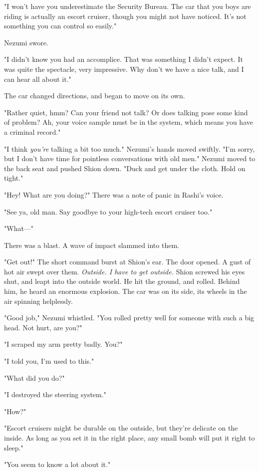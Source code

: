 "I won't have you underestimate the Security Bureau. The car that you
boys are riding is actually an escort cruiser, though you might not have
noticed. It's not something you can control so easily."

Nezumi swore.

"I didn't know you had an accomplice. That was something I didn't
expect. It was quite the spectacle, very impressive. Why don't we have a
nice talk, and I can hear all about it."

The car changed directions, and began to move on its own.

"Rather quiet, hmm? Can your friend not talk? Or does talking pose some
kind of problem? Ah, your voice sample must be in the system, which
means you have a criminal record."

"I think \emph{you're} talking a bit too much." Nezumi's hands moved swiftly.
"I'm sorry, but I don't have time for pointless conversations with old
men." Nezumi moved to the back seat and pushed Shion down. "Duck and get
under the cloth. Hold on tight."

"Hey! What are you doing?" There was a note of panic in Rashi's voice.

"See ya, old man. Say goodbye to your high-tech escort cruiser too."

"What---"

There was a blast. A wave of impact slammed into them.

"Get out!" The short command burst at Shion's ear. The door opened. A
gust of hot air swept over them. \emph{Outside. I have to get outside.} Shion
screwed his eyes shut, and leapt into the outside world. He hit the
ground, and rolled. Behind him, he heard an enormous explosion. The car
was on its side, its wheels in the air spinning helplessly.

"Good job," Nezumi whistled. "You rolled pretty well for someone with
such a big head. Not hurt, are you?"

"I scraped my arm pretty badly. You?"

"I told you, I'm used to this."

"What did you do?"

"I destroyed the steering system."

"How?"

"Escort cruisers might be durable on the outside, but they're delicate
on the inside. As long as you set it in the right place, any small bomb
will put it right to sleep."

"You seem to know a lot about it."

